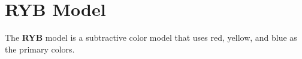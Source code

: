 \section{RYB Model}

  \begin{definition}[RYB]
    The \textbf{RYB} model is a subtractive color model that uses red, yellow, and blue as the primary colors. 
  \end{definition}


